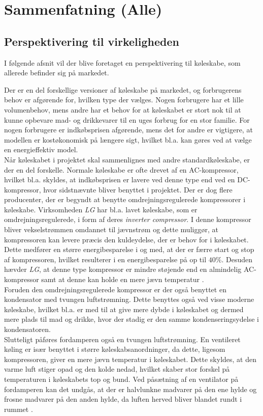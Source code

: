 \documentclass[../Hovedrapport.tex]{subfiles}
\begin{document}
\chapter{Sammenfatning (Alle)}
    \label{chap:Perspektivering}
    \vspace{-30pt}
\section{Perspektivering til virkeligheden}
I følgende afsnit vil der blive foretaget en perspektivering til køleskabe, som allerede befinder sig på markedet. 

Der er en del forskellige versioner af køleskabe på markedet, og forbrugerens behov er afgørende for, hvilken type der vælges. Nogen forbrugere har et lille volumenbehov, mens andre har et behov for at køleskabet er stort nok til at kunne opbevare mad- og drikkevarer til en uges forbrug for en stor familie. For nogen forbrugere er indkøbsprisen afgørende, mens det for andre er vigtigere, at modellen er kostøkonomisk på længere sigt, hvilket bl.a. kan gøres ved at vælge en energieffektiv model.\\
Når køleskabet i projektet skal sammenlignes med andre standardkøleskabe, er der en del forskelle. Normale køleskabe er ofte drevet af en AC-kompressor, hvilket bl.a. skyldes, at indkøbsprisen er lavere ved denne type end ved en DC-kompressor, hvor sidstnævnte bliver benyttet i projektet. Der er dog flere producenter, der er begyndt at benytte omdrejningsregulerede kompressorer i køleskabe. Virksomheden \textit{LG} har bl.a. lavet køleskabe, som er omdrejningsregulerede, i form af deres \textit{inverter compressor}. I denne kompressor bliver vekselstrømmen omdannet til jævnstrøm og dette muliggør, at kompressoren kan levere præcis den kuldeydelse, der er behov for i køleskabet. Dette medfører en større energibesparelse i og med, at der er færre start og stop af kompressoren, hvilket resulterer i en energibesparelse på op til $40\%$. Desuden hævder \textit{LG}, at denne type kompressor er mindre støjende end en almindelig AC-kompressor samt at denne kan holde en mere jævn temperatur  \citep{learneng}.  \\
Foruden den omdrejningsregulerede kompressor er der også benyttet en kondensator med tvungen luftstrømning. Dette benyttes også ved visse moderne køleskabe, hvilket bl.a. er med til at give mere dybde i køleskabet og dermed mere plads til mad og drikke, hvor der stadig er den samme kondenseringsydelse i kondensatoren.\\
Slutteligt påføres fordamperen også en tvungen luftstrømning. En ventileret køling er især benyttet i større køleskabsanordninger, da dette, ligesom kompressoren, giver en mere jævn temperatur i køleskabet. Dette skyldes, at den varme luft stiger opad og den kolde nedad, hvilket skaber stor forskel på temperaturen i køleskabets top og bund. Ved påsætning af en ventilator på fordamperen kan det undgås, at der er halvlunkne madvarer på den ene hylde og frosne madvarer på den anden hylde, da luften herved bliver blandet rundt i rummet \citep{whiteaway}.
    \newpage
\end{document}
